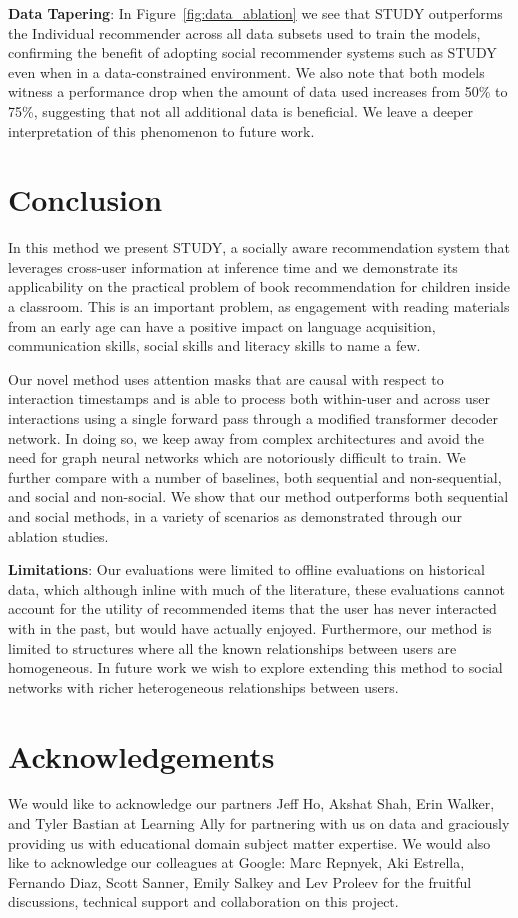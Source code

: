 \documentclass{article}
\begin{document}
\textbf{Data Tapering}: In Figure~\ref{fig:data_ablation} we see that STUDY outperforms the Individual recommender across all data subsets used to train the models, confirming the benefit of adopting social recommender systems such as STUDY even when in a data-constrained environment. We also note that both models witness a performance drop when the amount of data used increases from 50\% to 75\%, suggesting that not all additional data is beneficial. We leave a deeper interpretation of this phenomenon to future work.   

\section{Conclusion}

In this method we present STUDY, a socially aware recommendation system that leverages cross-user information at inference time and we demonstrate its applicability on the practical problem of book recommendation for children inside a classroom. This is an important problem, as engagement with reading materials from an early age can have a positive impact on language acquisition, communication skills, social skills and literacy skills to name a few.

Our novel method uses attention masks that are causal with respect to interaction timestamps and is able to process both within-user and across user interactions using a single forward pass through a modified transformer decoder network. In doing so, we keep away from complex architectures and avoid the need for graph neural networks which are notoriously difficult to train. We further compare with a number of baselines, both sequential and non-sequential, and social and non-social. We show that our method outperforms both sequential and social methods, in a variety of scenarios as demonstrated through our ablation studies.

\textbf{Limitations}: Our evaluations were limited to offline evaluations on historical data, which although inline with much of the literature, these evaluations cannot account for the utility of recommended items that the user has never interacted with in the past, but would have actually enjoyed. Furthermore, our method is limited to structures where all the known relationships between users are homogeneous. In future work we wish to explore extending this method to social networks with richer heterogeneous relationships between users.

\section{Acknowledgements}
We would like to acknowledge our partners Jeff Ho, Akshat Shah, Erin Walker, and Tyler Bastian at Learning Ally for partnering with us on data and graciously providing us with educational domain subject matter expertise. We would also like to acknowledge our colleagues at Google: Marc Repnyek, Aki Estrella, Fernando Diaz, Scott Sanner, Emily Salkey and Lev Proleev for the fruitful discussions, technical support and collaboration on this project.
\end{document}
